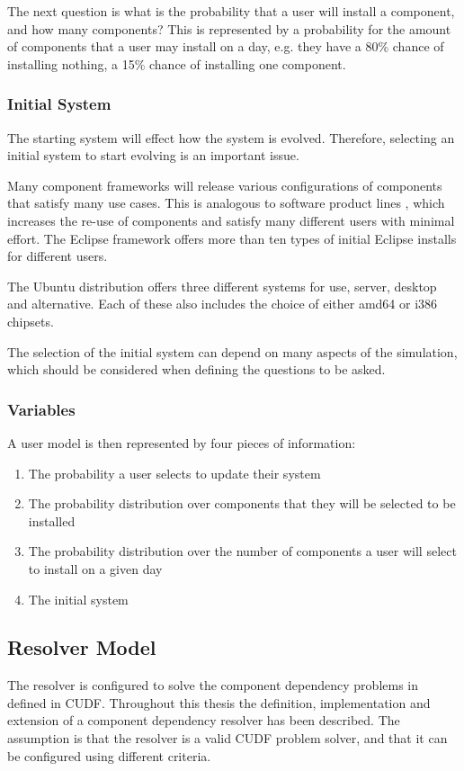 The next question is what is the probability that a user will install a component, and how many components?
This is represented by a probability for the amount of components that a user may install on a day,
e.g. they have a 80\% chance of installing nothing, a 15\% chance of installing one component.

\subsubsection{Initial System}
The starting system will effect how the system is evolved.
Therefore, selecting an initial system to start evolving is an important issue.

Many component frameworks will release various configurations of components that satisfy many use cases.
This is analogous to software product lines \cite{clements2001software}, which increases the re-use of components and satisfy many different users with minimal effort.
The Eclipse framework offers more than ten types of initial Eclipse installs for different users.

The Ubuntu distribution offers three different systems for use, server, desktop and alternative.
Each of these also includes the choice of either amd64 or i386 chipsets.

The selection of the initial system can depend on many aspects of the simulation, which should be considered when defining the questions to be asked.

\subsubsection{Variables}
A user model is then represented by four pieces of information:
\begin{enumerate}
  \item The probability a user selects to update their system
  \item The probability distribution over components that they will be selected to be installed
  \item The probability distribution over the number of components a user will select to install on a given day
  \item The initial system
\end{enumerate}


\subsection{Resolver Model}
The resolver is configured to solve the component dependency problems in defined in CUDF.
Throughout this thesis the definition, implementation and extension of a component dependency resolver has been described.
The assumption is that the resolver is a valid CUDF problem solver, and that it can be configured using different criteria.

